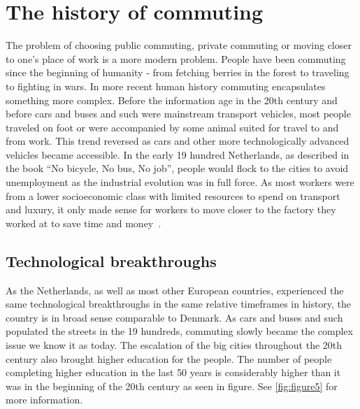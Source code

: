 \section{The history of commuting}\label{sec:the-history-of-commuting}

The problem of choosing public commuting, private commuting or moving closer to one's place of work is a more modern
problem.
People have been commuting since the beginning of humanity - from fetching berries in the forest to traveling to
fighting in wars.
In more recent human history commuting encapsulates something more complex.
Before the information age in the 20th century and before cars and buses and such were mainstream transport vehicles,
most people traveled on foot or were accompanied by some animal suited for travel to and from work.
This trend reversed as cars and other more technologically advanced vehicles became accessible.
In the early 19 hundred Netherlands, as described in the book ``No bicycle, No bus, No job'', people would flock to the
cities to avoid unemployment as the industrial evolution was in full force.
As most workers were from a lower socioeconomic class with limited resources to spend on transport and luxury, it only
made sense for workers to move closer to the factory they worked at to save time and money~\cite{bek2022}.

\subsection{Technological breakthroughs}\label{subsec:technological-breakthroughs}

As the Netherlands, as well as most other European countries, experienced the same technological breakthroughs in the
same relative timeframes in history, the country is in broad sense comparable to Denmark.
As cars and buses and such populated the streets in the 19 hundreds, commuting slowly became the complex issue we
know it as today.
The escalation of the big cities throughout the 20th century also brought higher education for the people.
The number of people completing higher education in the last 50 years is considerably higher than it was in the
beginning of the 20th century as seen in figure.
See \ref{fig:figure5} for more information.

